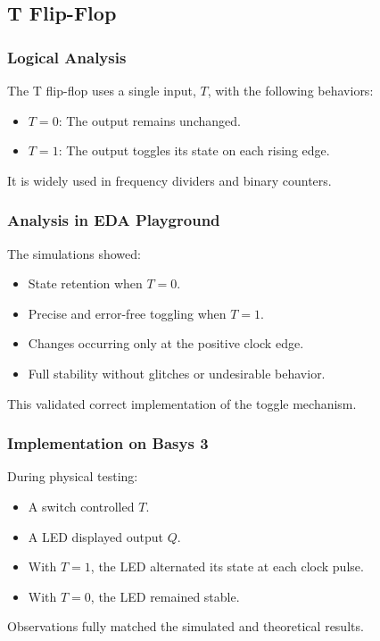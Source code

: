\documentclass[12pt]{article}  %
\begin{document}
\subsection{T Flip-Flop}

\subsubsection{Logical Analysis}
The T flip-flop uses a single input, $T$, with the following behaviors:
\begin{itemize}
    \item $T = 0$: The output remains unchanged.
    \item $T = 1$: The output toggles its state on each rising edge.
\end{itemize}
It is widely used in frequency dividers and binary counters.

\subsubsection{Analysis in EDA Playground}
The simulations showed:
\begin{itemize}
    \item State retention when $T = 0$.
    \item Precise and error-free toggling when $T = 1$.
    \item Changes occurring only at the positive clock edge.
    \item Full stability without glitches or undesirable behavior.
\end{itemize}
This validated correct implementation of the toggle mechanism.

\subsubsection{Implementation on Basys 3}
During physical testing:
\begin{itemize}
    \item A switch controlled $T$.
    \item A LED displayed output $Q$.
    \item With $T = 1$, the LED alternated its state at each clock pulse.
    \item With $T = 0$, the LED remained stable.
\end{itemize}
Observations fully matched the simulated and theoretical results.
\end{document}
